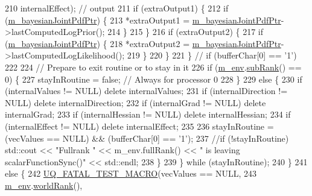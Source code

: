 \begin{DoxyCode}
210                                           internalEffect); \textcolor{comment}{// output}
211         \textcolor{keywordflow}{if} (extraOutput1) \{
212           \textcolor{keywordflow}{if} (\hyperlink{class_q_u_e_s_o_1_1_scalar_function_synchronizer_a0e17d294521cd22b297374ae2ff7f463}{m\_bayesianJointPdfPtr}) \{
213             *extraOutput1 = \hyperlink{class_q_u_e_s_o_1_1_scalar_function_synchronizer_a0e17d294521cd22b297374ae2ff7f463}{m\_bayesianJointPdfPtr}->lastComputedLogPrior();
214           \}
215         \}
216         \textcolor{keywordflow}{if} (extraOutput2) \{
217           \textcolor{keywordflow}{if} (\hyperlink{class_q_u_e_s_o_1_1_scalar_function_synchronizer_a0e17d294521cd22b297374ae2ff7f463}{m\_bayesianJointPdfPtr}) \{
218             *extraOutput2 = \hyperlink{class_q_u_e_s_o_1_1_scalar_function_synchronizer_a0e17d294521cd22b297374ae2ff7f463}{m\_bayesianJointPdfPtr}->lastComputedLogLikelihood();
219           \}
220         \}
221       \} \textcolor{comment}{// if (bufferChar[0] == '1')}
222 
224       \textcolor{comment}{// Prepare to exit routine or to stay in it}
226 \textcolor{comment}{}      \textcolor{keywordflow}{if} (\hyperlink{class_q_u_e_s_o_1_1_scalar_function_synchronizer_aa77a3d3b53267ef7c731836faaa082fb}{m\_env}.\hyperlink{class_q_u_e_s_o_1_1_base_environment_a172d52f993f1322ed45aaddf71518dbb}{subRank}() == 0) \{
227         stayInRoutine = \textcolor{keyword}{false}; \textcolor{comment}{// Always for processor 0}
228       \}
229       \textcolor{keywordflow}{else} \{
230         \textcolor{keywordflow}{if} (internalValues    != NULL) \textcolor{keyword}{delete} internalValues;
231         \textcolor{keywordflow}{if} (internalDirection != NULL) \textcolor{keyword}{delete} internalDirection;
232         \textcolor{keywordflow}{if} (internalGrad      != NULL) \textcolor{keyword}{delete} internalGrad;
233         \textcolor{keywordflow}{if} (internalHessian   != NULL) \textcolor{keyword}{delete} internalHessian;
234         \textcolor{keywordflow}{if} (internalEffect    != NULL) \textcolor{keyword}{delete} internalEffect;
235 
236         stayInRoutine = (vecValues == NULL) && (bufferChar[0] == \textcolor{charliteral}{'1'});
237         \textcolor{comment}{//if (!stayInRoutine) std::cout << "Fullrank " << m\_env.fullRank() << " is leaving
       scalarFunctionSync()" << std::endl;}
238       \}
239     \} \textcolor{keywordflow}{while} (stayInRoutine);
240   \}
241   \textcolor{keywordflow}{else} \{
242     \hyperlink{_defines_8h_a56d63d18d0a6d45757de47fcc06f574d}{UQ\_FATAL\_TEST\_MACRO}(vecValues == NULL,
243                         \hyperlink{class_q_u_e_s_o_1_1_scalar_function_synchronizer_aa77a3d3b53267ef7c731836faaa082fb}{m\_env}.\hyperlink{class_q_u_e_s_o_1_1_base_environment_a78b57112bbd0e6dd0e8afec00b40ffa7}{worldRank}(),

\end{DoxyCode}
